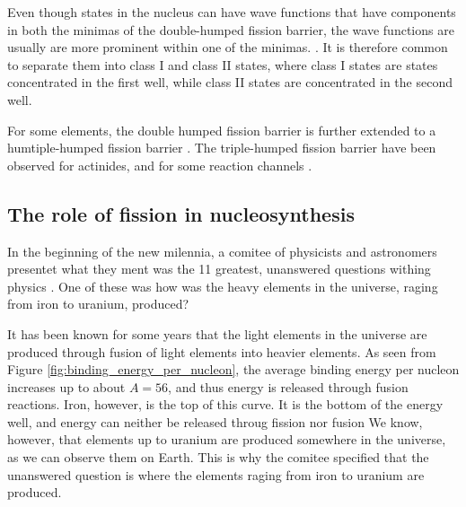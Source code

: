 \documentclass[]{article}
\begin{document}
\par
\vspace{3mm}

\noindent Even though states in the nucleus can have wave functions that have components in both the minimas of the double-humped fission barrier, the wave functions are usually are more prominent within one of the minimas. \cite{Wagemas1991}. It is therefore common to separate them into class I and class II states, where class I states are states concentrated in the first well, while class II states are concentrated in the second well. 

For some elements, the double humped fission barrier is further extended to a humtiple-humped fission barrier \cite{Goriely2017}. The triple-humped fission barrier have been observed for actinides, and for some reaction channels \cite{PhysRevC.74.014608}.
 
\subsection{The role of fission in nucleosynthesis}
\label{fission_in_astro}
In the beginning of the new milennia, a comitee of physicists and astronomers presentet what they ment was the 11 greatest, unanswered questions withing physics \cite{Haseltine2002}. One of these was how was the heavy elements in the universe, raging from iron to uranium, produced?

\par 
\vspace{3mm}
It has been known for some years that the light elements in the universe are produced through fusion of light elements into heavier elements. As seen from Figure \ref{fig:binding_energy_per_nucleon}, the average binding energy per nucleon increases up to about $A = 56$, and thus energy is released through fusion reactions. Iron, however, is the top of this curve. It is the bottom of the energy well, and energy can neither be released throug fission nor fusion We know, however, that elements up to uranium are produced somewhere in the universe, as we can observe them on Earth. This is why the comitee specified that the unanswered question is where the elements raging from iron to uranium are produced. 

\par
\vspace{3mm}
\end{document}
